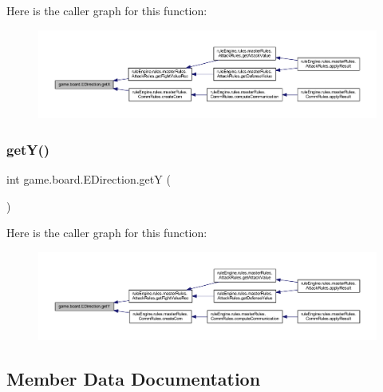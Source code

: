 Here is the caller graph for this function\+:
\nopagebreak
\begin{figure}[H]
\begin{center}
\leavevmode
\includegraphics[width=350pt]{enumgame_1_1board_1_1_e_direction_a28cdb19c1526655a4a28989d731c0b5a_icgraph}
\end{center}
\end{figure}
\mbox{\label{enumgame_1_1board_1_1_e_direction_aa2aa024ab277dd1c240e0ab77b2b248c}} 
\subsubsection{\texorpdfstring{get\+Y()}{getY()}}
{\footnotesize\ttfamily int game.\+board.\+E\+Direction.\+getY (\begin{DoxyParamCaption}{ }\end{DoxyParamCaption})\hspace{0.3cm}{\ttfamily [inline]}}

Here is the caller graph for this function\+:
\nopagebreak
\begin{figure}[H]
\begin{center}
\leavevmode
\includegraphics[width=350pt]{enumgame_1_1board_1_1_e_direction_aa2aa024ab277dd1c240e0ab77b2b248c_icgraph}
\end{center}
\end{figure}


\subsection{Member Data Documentation}
\mbox{\label{enumgame_1_1board_1_1_e_direction_a6955bc1cc480c347473b410f5d2992bb}} 
